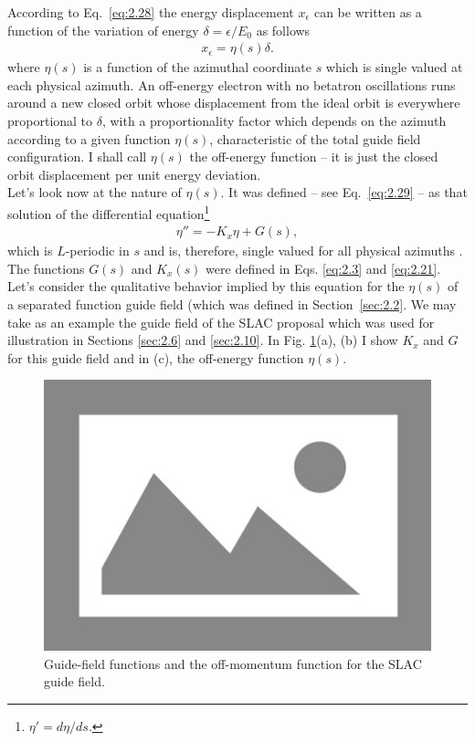 According to Eq.~\eqref{eq:2.28} the energy displacement $x_\epsilon$ can be written as a function of the variation of energy $\delta = \epsilon/E_0$ as follows
\begin{align} \label{eq:3.3}
	x_\epsilon = \eta(s) \delta.
\end{align}
where $\eta(s)$ is a function of the azimuthal coordinate $s$ which is single valued at
each physical azimuth. An off-energy electron with no betatron oscillations runs around a new closed orbit whose displacement from the ideal orbit is everywhere proportional to $\delta$, with a proportionality factor which depends on the azimuth according to a given function $\eta(s)$, characteristic of the total guide field configuration. I shall call $\eta(s)$ the off-energy function -- it is just the closed orbit displacement per unit energy deviation.\\
Let’s look now at the nature of $\eta(s)$. It was defined -- see Eq.~\eqref{eq:2.29} -- as that
solution of the differential equation\footnote{$\eta' = d\eta/ds.$}
\begin{align}\label{eq:3.4}
	\eta'' = -K_x\eta + G(s),
\end{align}
which is $L$-periodic in $s$ and is, therefore, single valued for all physical azimuths . The functions $G(s)$ and $K_x(s)$ were defined in Eqs. \eqref{eq:2.3} and \eqref{eq:2.21}.\\
Let’s consider the qualitative behavior implied by this equation for the $\eta(s)$ of a separated function guide field (which was defined in Section~\ref{sec:2.2}. We may take
as an example the guide field of the SLAC proposal which was used for illustration in Sections \ref{sec:2.6} and \ref{sec:2.10}. In Fig. \ref{fig:fig29}(a), (b) I show $K_x$ and $G$ for this guide field and in (c), the off-energy function $\eta(s)$.
\begin{figure}[!htb]
	\centering
	\includegraphics[width=0.8\linewidth]{./Figuras/placeholder.png}
	\caption{Guide-field functions and the off-momentum function for the SLAC guide field.}
	\label{fig:fig29}
\end{figure}
